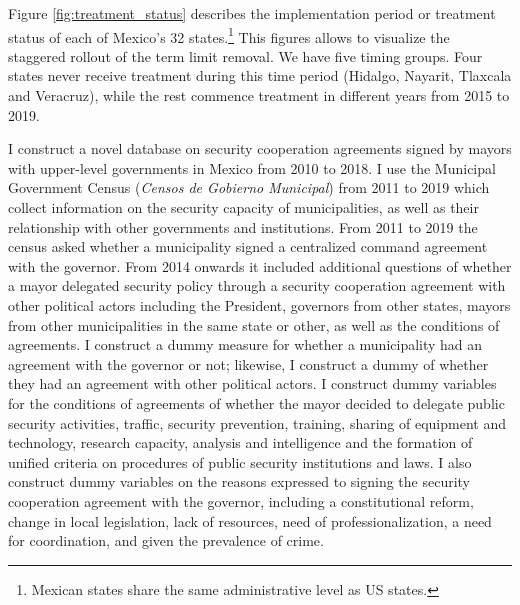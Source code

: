\documentclass[12pt]{amsart}
\makeatletter
\def\section{\@startsection{section}{1}
	\z@{1.0\linespacing\@plus\linespacing}{.5\linespacing}{\Large}}
\numberwithin{equation}{section}
\theoremstyle{definition}
\theoremstyle{definition}
\theoremstyle{definition}
\makeatother
\begin{document}
Figure \ref{fig:treatment_status} describes the implementation period or treatment status of each of Mexico's 32 states.\footnote{Mexican states share the same administrative level as US states.} This figures allows to visualize the staggered rollout of the term limit removal. We have five timing groups. Four states never receive treatment during this time period (Hidalgo, Nayarit, Tlaxcala and Veracruz), while the rest commence treatment in different years from 2015 to 2019. %
    

\section{Data \label{sec:data}}  

I construct a novel database on security cooperation agreements signed by mayors with upper-level governments in Mexico from 2010 to 2018. I use the Municipal Government Census (\emph{Censos de Gobierno Municipal}) from 2011 to 2019 which collect information on the security capacity of municipalities, as well as their relationship with other governments and institutions. From 2011 to 2019 the census asked whether a municipality signed a centralized command agreement with the governor. From 2014 onwards it included additional questions of whether a mayor delegated security policy through a security cooperation agreement with other political actors including the President, governors from other states, mayors from other municipalities in the same state or other, as well as the conditions of agreements. I construct a dummy measure for whether a municipality had an agreement with the governor or not; likewise, I construct a dummy of whether they had an agreement with other political actors. I construct dummy variables for the conditions of agreements of whether the mayor decided to delegate public security activities, traffic, security prevention, training, sharing of equipment and technology, research capacity, analysis and intelligence and the formation of unified criteria on procedures of public security institutions and laws. I also construct dummy variables on the reasons expressed to signing the security cooperation agreement with the governor, including a constitutional reform, change in local legislation, lack of resources, need of professionalization, a need for coordination, and given the prevalence of crime.
 
\end{document}
